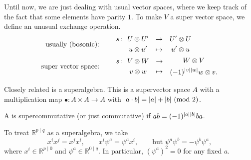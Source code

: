 Until now, we are just dealing with usual vector spaces, where we keep track of the fact that some elements have parity $1$.
To make $V$ a super vector space, we define an unusual exchange operation.
\begin{align}
  \text{usually (bosonic):} \qquad 
  &\begin{gathered}
    s \colon \\
    \qquad
  \end{gathered}
  \begin{gathered}
    U \otimes U' \\
    u \otimes u'
  \end{gathered}
  \quad
  \begin{gathered}
    \to \\
    \mapsto
  \end{gathered}
  \quad
  \begin{gathered}
    U' \otimes U \\
    u' \otimes u
  \end{gathered} \\
  \text{super vector space:} \qquad 
  &\begin{gathered}
    s \colon \\
    \qquad
  \end{gathered}
  \begin{gathered}
    V \otimes W \\
    v \otimes w
  \end{gathered}
  \quad
  \begin{gathered}
    \to \\
    \mapsto
  \end{gathered}
  \quad
  \begin{gathered}
    W \otimes V \\
    (-1)^{\abs{v} \abs{w}} w \otimes v.
  \end{gathered}
\end{align}

\begin{definition}[superalgebra]
  Closely related is a superalgebra. This is a supervector space $A$ with a multiplication map $\bullet\colon A \times A \to A$ with $\abs{ a \cdot b} = \abs{a} + \abs{b}\ (\text{mod } 2)$.
\end{definition}
\begin{definition}[commutative]
  A is supercommutative (or just commutative) if $ab = (-1)^{\abs{a} \abs{b}} b a$.
\end{definition}

\begin{example}[]
  To treat $\mathbb{R}^{p \mid q}$ as a superalgebra, we take
  \begin{equation}
    x^{i} x^{j} = x^{j} x^{i}, \qquad
    x^{i} \psi^{a} = \psi^{a} x^{i},\qquad
    \text{but } \psi^{a} \psi^{b} = -\psi^{b} \psi^{a},
  \end{equation}
  where $x^{i} \in \mathbb{R}^{p \mid 0}$ and $\psi^{a} \in \mathbb{R}^{0 \mid q}$.
  In particular, $(\psi^{a})^2 = 0$ for any fixed $a$.
\end{example}

